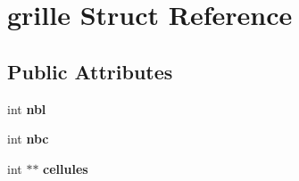 \hypertarget{structgrille}{}\section{grille Struct Reference}
\label{structgrille}
\subsection*{Public Attributes}
\begin{DoxyCompactItemize}
\item 
\mbox{\label{structgrille_a0b4da1e205825df205b0c004d105d62a}} 
int {\bfseries nbl}
\item 
\mbox{\label{structgrille_a48d6706d41bee6fff9200d872b8b0cd0}} 
int {\bfseries nbc}
\item 
\mbox{\label{structgrille_a428cf0c0297ce04e0206ba0067ac3b42}} 
int $\ast$$\ast$ {\bfseries cellules}
\end{DoxyCompactItemize}
